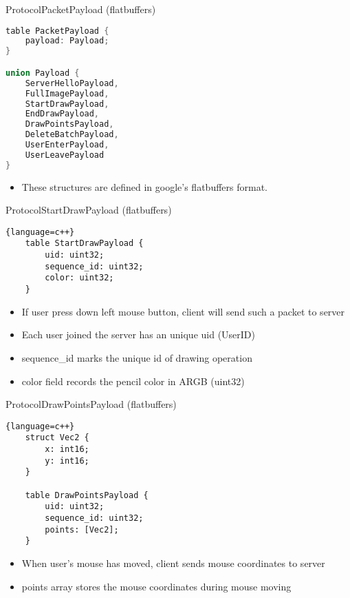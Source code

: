 \documentclass{beamer}
\begin{document}
\begin{frame}[fragile]{Protocol}{PacketPayload (flatbuffers)}
\begin{lstlisting}[language=c++]
table PacketPayload {
    payload: Payload;
}

union Payload {
    ServerHelloPayload,
    FullImagePayload,
    StartDrawPayload,
    EndDrawPayload,
    DrawPointsPayload,
    DeleteBatchPayload,
    UserEnterPayload,
    UserLeavePayload
}
\end{lstlisting}

\begin{itemize}
    \item {
        These structures are defined in google's flatbuffers format.
    }
\end{itemize}
\end{frame}

\begin{frame}[fragile]{Protocol}{StartDrawPayload (flatbuffers)}
\begin{lstlisting}{language=c++}
    table StartDrawPayload {
        uid: uint32;
        sequence_id: uint32;
        color: uint32;
    }
\end{lstlisting}

\begin{itemize}
    \item {
        If user press down left mouse button, client will send such a packet to server
    }
    \item {
        Each user joined the server has an unique uid (UserID)
    }
    \item {
        sequence\_id marks the unique id of drawing operation
    }
    \item {
        color field records the pencil color in ARGB (uint32)
    }
\end{itemize}
\end{frame}

\begin{frame}[fragile]{Protocol}{DrawPointsPayload (flatbuffers)}
\begin{lstlisting}{language=c++}
    struct Vec2 {
        x: int16;
        y: int16;
    }

    table DrawPointsPayload {
        uid: uint32;
        sequence_id: uint32;
        points: [Vec2];
    }
\end{lstlisting}

\begin{itemize}
    \item {
        When user's mouse has moved, client sends mouse coordinates to server
    }
    \item {
        points array stores the mouse coordinates during mouse moving
    }
\end{itemize}
\end{frame}
\end{document}
